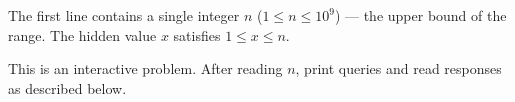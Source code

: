 The first line contains a single integer $n$ ($1 \leq n \leq 10^9$) --- the upper bound of the range.
The hidden value $x$ satisfies $1 \leq x \leq n$.

This is an interactive problem. After reading $n$, print queries and read responses as described below.
